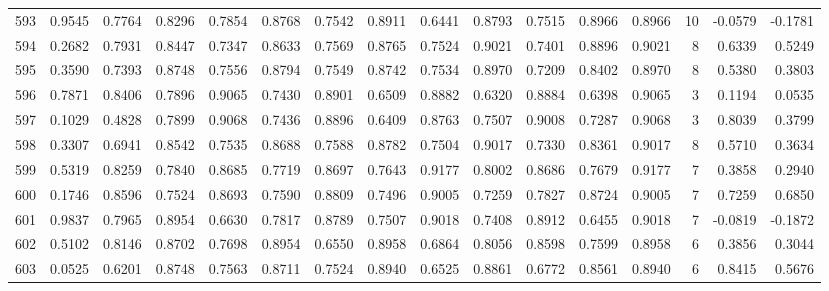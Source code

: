 \begin{tabular}{lrrrrrrrrrrrrrrr}
593 &      0.9545 &  0.7764 &  0.8296 &  0.7854 &  0.8768 &  0.7542 &  0.8911 &  0.6441 &  0.8793 &  0.7515 &   0.8966 &     0.8966 &     10 &                   -0.0579 &                    -0.1781 \\
594 &      0.2682 &  0.7931 &  0.8447 &  0.7347 &  0.8633 &  0.7569 &  0.8765 &  0.7524 &  0.9021 &  0.7401 &   0.8896 &     0.9021 &      8 &                    0.6339 &                     0.5249 \\
595 &      0.3590 &  0.7393 &  0.8748 &  0.7556 &  0.8794 &  0.7549 &  0.8742 &  0.7534 &  0.8970 &  0.7209 &   0.8402 &     0.8970 &      8 &                    0.5380 &                     0.3803 \\
596 &      0.7871 &  0.8406 &  0.7896 &  0.9065 &  0.7430 &  0.8901 &  0.6509 &  0.8882 &  0.6320 &  0.8884 &   0.6398 &     0.9065 &      3 &                    0.1194 &                     0.0535 \\
597 &      0.1029 &  0.4828 &  0.7899 &  0.9068 &  0.7436 &  0.8896 &  0.6409 &  0.8763 &  0.7507 &  0.9008 &   0.7287 &     0.9068 &      3 &                    0.8039 &                     0.3799 \\
598 &      0.3307 &  0.6941 &  0.8542 &  0.7535 &  0.8688 &  0.7588 &  0.8782 &  0.7504 &  0.9017 &  0.7330 &   0.8361 &     0.9017 &      8 &                    0.5710 &                     0.3634 \\
599 &      0.5319 &  0.8259 &  0.7840 &  0.8685 &  0.7719 &  0.8697 &  0.7643 &  0.9177 &  0.8002 &  0.8686 &   0.7679 &     0.9177 &      7 &                    0.3858 &                     0.2940 \\
600 &      0.1746 &  0.8596 &  0.7524 &  0.8693 &  0.7590 &  0.8809 &  0.7496 &  0.9005 &  0.7259 &  0.7827 &   0.8724 &     0.9005 &      7 &                    0.7259 &                     0.6850 \\
601 &      0.9837 &  0.7965 &  0.8954 &  0.6630 &  0.7817 &  0.8789 &  0.7507 &  0.9018 &  0.7408 &  0.8912 &   0.6455 &     0.9018 &      7 &                   -0.0819 &                    -0.1872 \\
602 &      0.5102 &  0.8146 &  0.8702 &  0.7698 &  0.8954 &  0.6550 &  0.8958 &  0.6864 &  0.8056 &  0.8598 &   0.7599 &     0.8958 &      6 &                    0.3856 &                     0.3044 \\
603 &      0.0525 &  0.6201 &  0.8748 &  0.7563 &  0.8711 &  0.7524 &  0.8940 &  0.6525 &  0.8861 &  0.6772 &   0.8561 &     0.8940 &      6 &                    0.8415 &                     0.5676 \\

\end{tabular}
